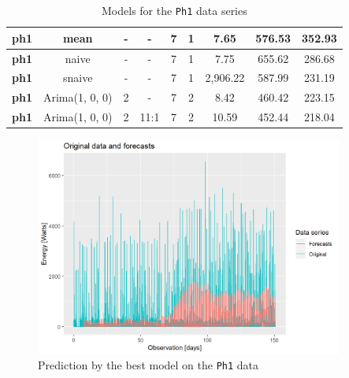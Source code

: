 \documentclass[12pt,a4paper,titlepage]{report}
\begin{document}
\begin{table}[htbp]
\begin{tabular}{|c|c|c|c|c|c|c|c|c|}
        \textbf{ph1}      & mean                    & - & -    & 7 & 1 & 7.65     & 576.53 & 352.93 \\ \hline
        \textbf{ph1}      & naive                   & - & -    & 7 & 1 & 7.75     & 655.62 & 286.68 \\ \hline
        \textbf{ph1}      & snaive                  & - & -    & 7 & 1 & 2,906.22 & 587.99 & 231.19 \\ \hline
        \textbf{ph1}      & Arima(1, 0, 0)  & 2 & -    & 7 & 2 & 8.42     & 460.42 & 223.15 \\ \hline
        \textbf{ph1}      & Arima(1, 0, 0)  & 2 & 11:1 & 7 & 2 & 10.59    & 452.44 & 218.04 \\ \hline
    \end{tabular}
    
    \centering
    \caption{Models for the \texttt{Ph1} data series}
    \label{ph1results}
\end{table}

\begin{figure}[htbp]
    \centering
    \includegraphics[width=0.9\textwidth]{dbestph1}
    \caption{Prediction by the best model on the \texttt{Ph1} data}
    \label{dbestph1}
\end{figure}
\end{document}
